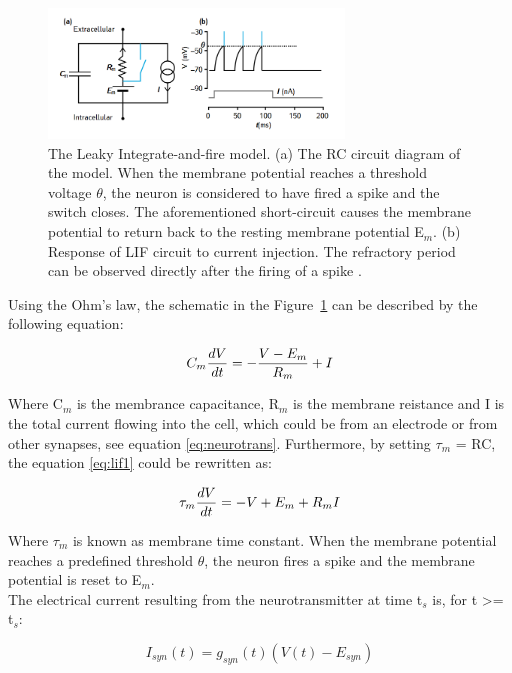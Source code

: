 \begin{figure}[h!]
\centering
\centering
\includegraphics[width=0.7\textwidth]{chapter2/lif1new.png}
	\caption{The Leaky Integrate-and-fire model. (a) The RC circuit diagram of the model. When the membrane potential reaches a threshold voltage ${\theta}$, the neuron is considered to have fired a spike and the switch closes. The aforementioned short-circuit causes the membrane potential to return back to the resting membrane potential E$_{m}$. (b) Response of LIF circuit to current injection. The refractory period can be observed directly after the firing of a spike \cite{sterratt2011principles}.}
	\label{lif1new}
\end{figure}

Using the Ohm's law, the schematic in the Figure~\ref{lif1new} can be described by the following equation:

\begin{equation} \label{eq:lif1}
C_{m} {dV\over dt} =- { {V - E_{m}} \over R_{m}} + I 
\end{equation}

Where C$_{m}$ is the membrance capacitance, R$_{m}$ is the membrane reistance and I is the total current flowing into the cell, which could be from an electrode or from other synapses, see equation \ref{eq:neurotrans}. Furthermore, by setting ${\tau}_{m}$ = RC, the equation \ref{eq:lif1} could be rewritten as:

\begin{equation} \label{eq:lif2}
{\tau}_{m} {dV\over dt} = -V + E_{m} + R_{m}I
\end{equation}

Where ${\tau}_{m}$ is known as membrane time constant. When the membrane potential reaches a predefined threshold ${\theta}$, the neuron fires a spike and the membrane potential is reset to E$_{m}$.\\

The electrical current resulting from the neurotransmitter at time t$_{s}$ is, for t >= t$_{s}$:

\begin{equation} \label{eq:neurotrans}
	I_{syn}(t) = g_{syn}(t)(V(t) - E_{syn})
\end{equation}

